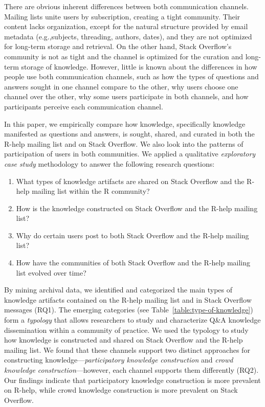 \documentclass[smallextended]{svjour3}       %
\newcommand{\channel}{communication channel\xspace}
\newcommand{\channels}{communication channels\xspace}
\newcommand{\SO}{Stack Overflow\xspace}
\newcommand{\RH}{R-help\xspace}
\newcommand{\rqa}{What types of knowledge artifacts are shared on Stack Overflow and the R-help mailing list within the R community?}
\newcommand{\rqb}{How is the knowledge constructed on Stack Overflow and the R-help mailing list?}
\newcommand{\rqc}{Why do certain users post to both Stack Overflow and the R-help mailing list?}
\newcommand{\rqd}{How have the communities of both Stack Overflow and the R-help mailing list evolved over time?}
\begin{document}
There are obvious inherent differences between both \channels. Mailing lists unite users by subscription, creating a tight community. Their content lacks organization, except for the natural structure provided by email metadata (e.g.,subjects, threading, authors, dates), and they are not optimized for long-term storage and retrieval. On the other hand, \SO's community is not as tight and the channel is optimized for the curation and long-term storage of knowledge. However, little is known about the differences in how people use both \channels, such as how the types of questions and answers sought in one channel compare to the other, why users choose one channel over the other, why some users participate in both channels, and how participants perceive each \channel.



In this paper, we empirically compare how
knowledge, specifically knowledge manifested as questions and answers,
is sought, shared, and curated in both the \RH mailing list and on
\SO.  We also look into the patterns of participation of users in both
communities. 
We applied a qualitative \textit{exploratory case study}
methodology to answer the following research questions:

\begin{enumerate}%
\item \rqa
\item \rqb
\item \rqc
\item \rqd
\end{enumerate}

By mining archival data, we identified and categorized the main types
of knowledge artifacts contained on the \RH mailing list and in \SO
messages (RQ1). The emerging categories (see
Table~\ref{table:type-of-knowledge}) form a \textit{typology} that
allows researchers to study and characterize Q\&A knowledge
dissemination within a community of practice. We used the typology to
study how knowledge is constructed and shared on \SO and the \RH
mailing list. We found that these channels support two distinct
approaches for constructing knowledge---\textit{participatory
  knowledge construction} and \textit{crowd knowledge
  construction}---however, each channel supports them differently
(RQ2). Our findings indicate that participatory knowledge construction
is more prevalent on \RH, while crowd knowledge construction is more
prevalent on \SO.
\end{document}
